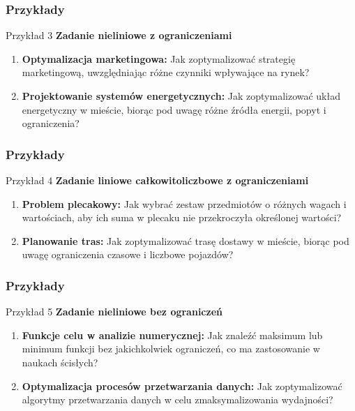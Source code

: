 \documentclass{beamer}
\begin{document}
\begin{frame}
    \frametitle{Przykłady}
    \begin{block}{Przykład 3}
    \textbf{Zadanie nieliniowe z ograniczeniami} 
        \begin{enumerate}
            \item \textbf{Optymalizacja marketingowa:} Jak zoptymalizować strategię marketingową, uwzględniając różne czynniki wpływające na rynek?
            \item \textbf{Projektowanie systemów energetycznych:} Jak zoptymalizować układ energetyczny w mieście, biorąc pod uwagę różne źródła energii, popyt i ograniczenia?
        \end{enumerate}
    \end{block}
\end{frame}

\begin{frame}
    \frametitle{Przykłady}
    \begin{block}{Przykład 4}
    \textbf{Zadanie liniowe całkowitoliczbowe z ograniczeniami} 
        \begin{enumerate}
            \item \textbf{Problem plecakowy:} Jak wybrać zestaw przedmiotów o różnych wagach i wartościach, aby ich suma w plecaku nie przekroczyła określonej wartości?
            \item \textbf{Planowanie tras:} Jak zoptymalizować trasę dostawy w mieście, biorąc pod uwagę ograniczenia czasowe i liczbowe pojazdów?
        \end{enumerate}
    \end{block}
\end{frame}

\begin{frame}
    \frametitle{Przykłady}
    \begin{block}{Przykład 5}
    \textbf{Zadanie nieliniowe bez ograniczeń} 
        \begin{enumerate}
            \item \textbf{Funkcje celu w analizie numerycznej:} Jak znaleźć maksimum lub minimum funkcji bez jakichkolwiek ograniczeń, co ma zastosowanie w naukach ścisłych?
            \item \textbf{Optymalizacja procesów przetwarzania danych:} Jak zoptymalizować algorytmy przetwarzania danych w celu zmaksymalizowania wydajności?
        \end{enumerate}
    \end{block}
\end{frame}
\end{document}
